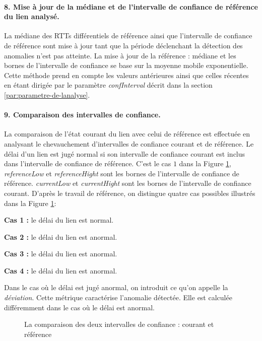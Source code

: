 \paragraph{8. Mise à jour de la médiane et de l'intervalle  de confiance de  référence du lien analysé.} La médiane des RTTs différentiels de référence ainsi que l'intervalle de confiance de référence sont mise à jour tant que la période déclenchant la détection des anomalies n'est pas atteinte.  La mise à jour de la référence : médiane et les bornes de l'intervalle de confiance se base sur la moyenne mobile exponentielle. Cette méthode prend en compte les valeurs antérieures ainsi que celles récentes en étant dirigée par le paramètre \textit{confInterval} décrit dans la section \ref{par:parametre-de-lanalyse}.


\paragraph{9. Comparaison des intervalles de confiance.} 

La comparaison de l'état courant du lien avec celui de référence est effectuée en analysant le chevauchement d'intervalles de confiance  courant et de référence. Le délai d'un lien est jugé normal si son intervalle de confiance courant est inclus dans l'intervalle de confiance de référence. C'est le cas $1$ dans la Figure 	\ref{fig:intervals-comparaison},  \textit{referenceLow} et \textit{referenceHight} sont les bornes de l'intervalle de confiance de référence.  \textit{currentLow} et \textit{currentHight} sont les bornes de l'intervalle de confiance courant.
D'après le travail de référence, on distingue quatre cas possibles  illustrés dans la Figure 	\ref{fig:intervals-comparaison}:

\textbf{Cas 1 :} le délai du lien est normal.

\textbf{Cas 2 :} le délai du lien est anormal.

\textbf{Cas 3 :} le délai du lien est anormal.

\textbf{Cas 4 :} le délai du lien est anormal.

Dans le cas où le délai est jugé anormal, on introduit ce qu'on appelle la \textit{déviation}. Cette métrique caractérise l'anomalie détectée. Elle est calculée différemment dans le cas où le délai est anormal.

\begin{figure}[h]
	\centering
	\captionsetup{justification=centering}
	\resizebox{\textwidth}{!}{
		
	}
	\caption{La comparaison des deux intervalles de confiance : courant et référence }
	\label{fig:intervals-comparaison}
\end{figure}

